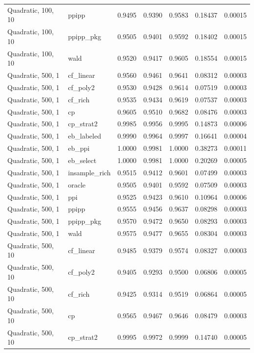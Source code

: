 \begin{longtable}{llrrrrr}
Quadratic, 100, 10 & ppipp & 0.9495 & 0.9390 & 0.9583 & 0.18437 & 0.00015 \\
Quadratic, 100, 10 & ppipp\_pkg & 0.9505 & 0.9401 & 0.9592 & 0.18402 & 0.00015 \\
Quadratic, 100, 10 & wald & 0.9520 & 0.9417 & 0.9605 & 0.18554 & 0.00015 \\
Quadratic, 500, 1 & cf\_linear & 0.9560 & 0.9461 & 0.9641 & 0.08312 & 0.00003 \\
Quadratic, 500, 1 & cf\_poly2 & 0.9530 & 0.9428 & 0.9614 & 0.07519 & 0.00003 \\
Quadratic, 500, 1 & cf\_rich & 0.9535 & 0.9434 & 0.9619 & 0.07537 & 0.00003 \\
Quadratic, 500, 1 & cp & 0.9605 & 0.9510 & 0.9682 & 0.08476 & 0.00003 \\
Quadratic, 500, 1 & cp\_strat2 & 0.9985 & 0.9956 & 0.9995 & 0.14873 & 0.00006 \\
Quadratic, 500, 1 & eb\_labeled & 0.9990 & 0.9964 & 0.9997 & 0.16641 & 0.00004 \\
Quadratic, 500, 1 & eb\_ppi & 1.0000 & 0.9981 & 1.0000 & 0.38273 & 0.00011 \\
Quadratic, 500, 1 & eb\_select & 1.0000 & 0.9981 & 1.0000 & 0.20269 & 0.00005 \\
Quadratic, 500, 1 & insample\_rich & 0.9515 & 0.9412 & 0.9601 & 0.07499 & 0.00003 \\
Quadratic, 500, 1 & oracle & 0.9505 & 0.9401 & 0.9592 & 0.07509 & 0.00003 \\
Quadratic, 500, 1 & ppi & 0.9525 & 0.9423 & 0.9610 & 0.10964 & 0.00006 \\
Quadratic, 500, 1 & ppipp & 0.9555 & 0.9456 & 0.9637 & 0.08298 & 0.00003 \\
Quadratic, 500, 1 & ppipp\_pkg & 0.9570 & 0.9472 & 0.9650 & 0.08293 & 0.00003 \\
Quadratic, 500, 1 & wald & 0.9575 & 0.9477 & 0.9655 & 0.08304 & 0.00003 \\
Quadratic, 500, 10 & cf\_linear & 0.9485 & 0.9379 & 0.9574 & 0.08327 & 0.00003 \\
Quadratic, 500, 10 & cf\_poly2 & 0.9405 & 0.9293 & 0.9500 & 0.06806 & 0.00005 \\
Quadratic, 500, 10 & cf\_rich & 0.9425 & 0.9314 & 0.9519 & 0.06864 & 0.00005 \\
Quadratic, 500, 10 & cp & 0.9565 & 0.9467 & 0.9646 & 0.08479 & 0.00003 \\
Quadratic, 500, 10 & cp\_strat2 & 0.9995 & 0.9972 & 0.9999 & 0.14740 & 0.00005 \\

\end{longtable}
